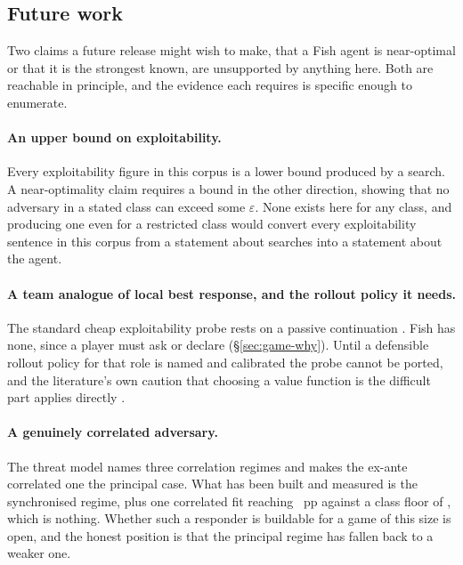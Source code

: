 \subsection{Future work}
\label{sec:discussion-future}

Two claims a future release might wish to make, that a Fish agent is near-optimal or that it is the
strongest known, are unsupported by anything here. Both are reachable in principle, and the evidence
each requires is specific enough to enumerate.

\paragraph{An upper bound on exploitability.} Every exploitability figure in this corpus is a lower
bound produced by a search. A near-optimality claim requires a bound in the other direction, showing
that no adversary in a stated class can exceed some $\varepsilon$. None exists here for any class, and
producing one even for a restricted class would convert every exploitability sentence in this corpus
from a statement about searches into a statement about the agent.

\paragraph{A team analogue of local best response, and the rollout policy it needs.} The standard
cheap exploitability probe rests on a passive continuation \cite{lisy2017lbr}. Fish has none, since a
player must ask or declare (\S\ref{sec:game-why}). Until a defensible rollout policy for that role is
named and calibrated the probe cannot be ported, and the literature's own caution that choosing a
value function is the difficult part applies directly \cite{brown2018depthlimited}.

\paragraph{A genuinely correlated adversary.} The threat model names three correlation regimes and
makes the ex-ante correlated one the principal case. What has been built and measured is the
synchronised regime, plus one correlated fit reaching \vsevenCorrelatedFit{}~pp against a class floor
of \vsevenCorrelatedFloor{}, which is nothing. Whether such a responder is buildable for a game of
this size is open, and the honest position is that the principal regime has fallen back to a weaker
one.


